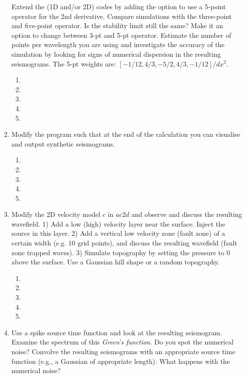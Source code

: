 \begin{enumerate}
Extend the (1D and/or 2D) codes by adding the option to use a 5-point  operator for the 2nd derivative. Compare simulations with the three-point and five-point operator. Is the stability limit still the same? Make it an option to change between 3-pt and 5-pt operator. Estimate the number of points per wavelength you are using and investigate the accuracy of the simulation by looking for signs of numerical dispersion in the resulting seismograms. The 5-pt weights are: $[-1/12, 4/3, -5/2, 4/3, -1/12]/dx^2$. 
\begin{enumerate}
\item[]
\item[]
\item[] 
\item[]
\item[] 
\end{enumerate}
\item 
Modify the program such that at the end of the calculation you can visualise and output synthetic seismograms. 
\begin{enumerate}
\item[]
\item[]
\item[] 
\item[]
\item[] 
\end{enumerate}
\item
Modify the 2D velocity model $c$ in $ac2d$ and observe and discuss the resulting wavefield. 1) Add a low (high) velocity layer near the surface. Inject the source in this layer. 2) Add a vertical low velocity zone (fault zone) of a certain width (e.g. 10 grid points), and discuss the resulting wavefield (fault zone trapped waves). 3) Simulate topography by setting the pressure to 0 above the surface. Use a Gaussian hill shape or a random topography.
\begin{enumerate}
\item[]
\item[]
\item[] 
\item[]
\item[] 
\end{enumerate}
\item
 Use a spike source time function and look at the resulting seismogram. Examine the spectrum of  this  {\it Green's function}. Do you spot the numerical noise? 
Convolve the resulting seismograms with an appropriate source time function (e.g., a Gaussian of appropriate length). What happens with the numerical noise?

\end{enumerate}
